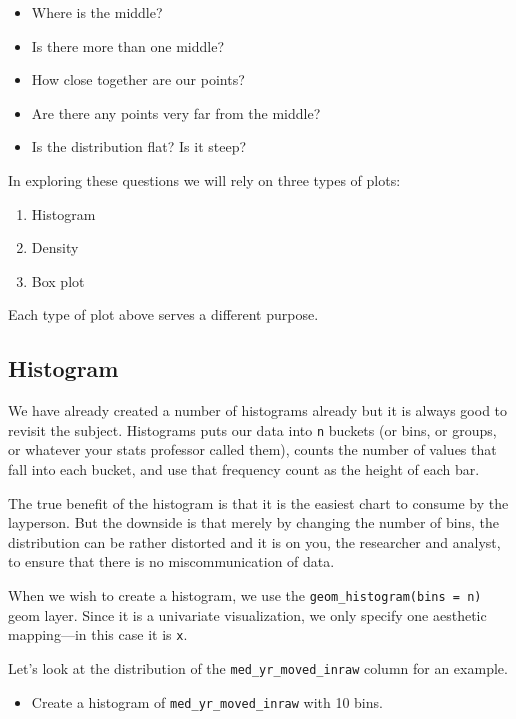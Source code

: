 \documentclass[
]{book}
\providecommand{\tightlist}{%
  \setlength{\itemsep}{0pt}\setlength{\parskip}{0pt}}
\begin{document}
\begin{itemize}
\tightlist
\item
  Where is the middle?
\item
  Is there more than one middle?
\item
  How close together are our points?
\item
  Are there any points very far from the middle?
\item
  Is the distribution flat? Is it steep?
\end{itemize}

In exploring these questions we will rely on three types of plots:

\begin{enumerate}
\def\labelenumi{\arabic{enumi}.}
\tightlist
\item
  Histogram
\item
  Density
\item
  Box plot
\end{enumerate}

Each type of plot above serves a different purpose.

\hypertarget{histogram}{%
\subsection{Histogram}\label{histogram}}

We have already created a number of histograms already but it is always good to revisit the subject. Histograms puts our data into \texttt{n} buckets (or bins, or groups, or whatever your stats professor called them), counts the number of values that fall into each bucket, and use that frequency count as the height of each bar.

The true benefit of the histogram is that it is the easiest chart to consume by the layperson. But the downside is that merely by changing the number of bins, the distribution can be rather distorted and it is on you, the researcher and analyst, to ensure that there is no miscommunication of data.

When we wish to create a histogram, we use the \texttt{geom\_histogram(bins\ =\ n)} geom layer. Since it is a univariate visualization, we only specify one aesthetic mapping---in this case it is \texttt{x}.

Let's look at the distribution of the \texttt{med\_yr\_moved\_inraw} column for an example.

\begin{itemize}
\tightlist
\item
  Create a histogram of \texttt{med\_yr\_moved\_inraw} with 10 bins.
\end{itemize}
\end{document}
